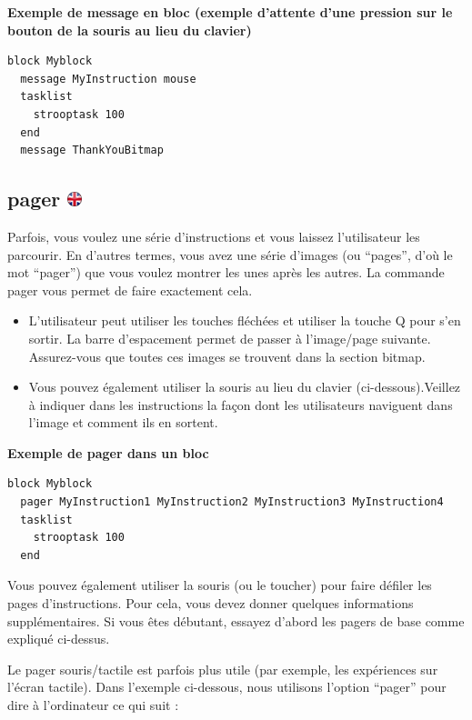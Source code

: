 \documentclass[
]{book}
\providecommand{\tightlist}{%
  \setlength{\itemsep}{0pt}\setlength{\parskip}{0pt}}
\begin{document}
\textbf{Exemple de message en bloc (exemple d'attente d'une pression sur le bouton de la souris au lieu du clavier)}

\begin{verbatim}
block Myblock
  message MyInstruction mouse
  tasklist
    strooptask 100
  end
  message ThankYouBitmap
\end{verbatim}

\hypertarget{pager}{%
\subsection[pager ]{\texorpdfstring{pager \href{https://www.psytoolkit.org/doc3.4.0/syntax.html\#block-pager}{\protect\includegraphics{img/ukflag.png}}}{pager }}\label{pager}}

Parfois, vous voulez une série d'instructions et vous laissez l'utilisateur les parcourir. En d'autres termes, vous avez une série d'images (ou ``pages'', d'où le mot ``pager'') que vous voulez montrer les unes après les autres. La commande pager vous permet de faire exactement cela.

\begin{itemize}
\tightlist
\item
  L'utilisateur peut utiliser les touches fléchées et utiliser la touche Q pour s'en sortir. La barre d'espacement permet de passer à l'image/page suivante. Assurez-vous que toutes ces images se trouvent dans la section bitmap.
\item
  Vous pouvez également utiliser la souris au lieu du clavier (ci-dessous).Veillez à indiquer dans les instructions la façon dont les utilisateurs naviguent dans l'image et comment ils en sortent.
\end{itemize}

\textbf{Exemple de pager dans un bloc}

\begin{verbatim}
block Myblock
  pager MyInstruction1 MyInstruction2 MyInstruction3 MyInstruction4
  tasklist
    strooptask 100
  end
\end{verbatim}

Vous pouvez également utiliser la souris (ou le toucher) pour faire défiler les pages d'instructions. Pour cela, vous devez donner quelques informations supplémentaires. Si vous êtes débutant, essayez d'abord les pagers de base comme expliqué ci-dessus.

Le pager souris/tactile est parfois plus utile (par exemple, les expériences sur l'écran tactile). Dans l'exemple ci-dessous, nous utilisons l'option ``pager'' pour dire à l'ordinateur ce qui suit :
\end{document}
